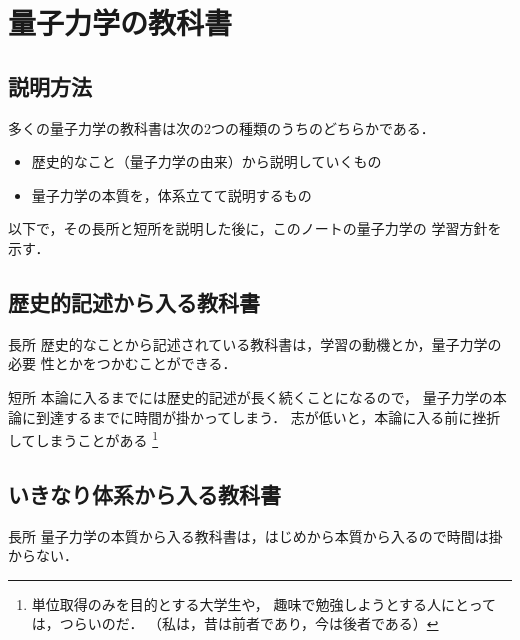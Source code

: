 ﻿%
    \section{量子力学の教科書}
        \subsection{説明方法}
            多くの量子力学の教科書は次の2つの種類のうちのどちらかである．
            \begin{itemize}
                \item 歴史的なこと（量子力学の由来）から説明していくもの
                \item 量子力学の本質を，体系立てて説明するもの
            \end{itemize}
            以下で，その長所と短所を説明した後に，このノートの量子力学の
            学習方針を示す．

        \subsection{歴史的記述から入る教科書}
            \begin{mysmallsec}{長所}
                歴史的なことから記述されている教科書は，学習の動機とか，量子力学の必要
                性とかをつかむことができる．
            \end{mysmallsec}

            \begin{mysmallsec}{短所}
                本論に入るまでには歴史的記述が長く続くことになるので，
                量子力学の本論に到達するまでに時間が掛かってしまう．
                志が低いと，本論に入る前に挫折してしまうことがある
                \footnote{
                    単位取得のみを目的とする大学生や，
                    趣味で勉強しようとする人にとっては，つらいのだ．
                    （私は，昔は前者であり，今は後者である）
                }
            \end{mysmallsec}

        \subsection{いきなり体系から入る教科書}
            \begin{mysmallsec}{長所}
                量子力学の本質から入る教科書は，はじめから本質から入るので時間は掛からない．
            \end{mysmallsec}

